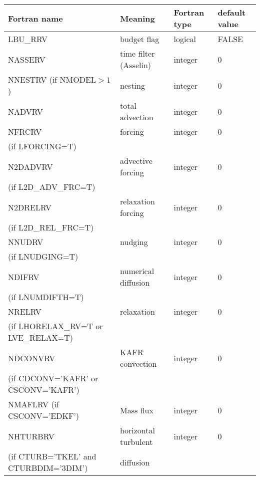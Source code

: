 \begin{center}
\begin{tabular} {|p{8cm}|p{4cm}|>{\centering}p{1.5cm}|p{1.5cm}<{\centering}|}
\hline
Fortran name & Meaning & Fortran type & default value \\
\hline\hline
LBU\_RRV & budget flag & logical & FALSE\index{LBU\_RRV!\innam{NAM\_BU\_RRV}} \\\hline
NASSERV  & time filter (Asselin)   & integer  &  0 \index{NASSERV!\innam{NAM\_BU\_RRV}} \\\hline
NNESTRV (if NMODEL$>1$) & nesting           & integer  &  0 \index{NNESTRV!\innam{NAM\_BU\_RRV}} \\\hline
NADVRV   & total advection   & integer  &  0 \index{NADVRV!\innam{NAM\_BU\_RTH}}\\\hline
NFRCRV   & forcing           & integer  &  0 \index{NFRCRV!\innam{NAM\_BU\_RRV}} \\
(if LFORCING=T) &  &   &   \\\hline
N2DADVRV   &advective forcing           & integer  &  0 \index{N2DADVRV!\innam{NAM\_BU\_RRV}} \\
(if L2D\_ADV\_FRC=T) &  &   &   \\\hline
N2DRELRV   & relaxation forcing           & integer  &  0 \index{N2DRLERV!\innam{NAM\_BU\_RRV}} \\
(if L2D\_REL\_FRC=T) &  &   &   \\\hline
NNUDRV   & nudging           & integer  &  0 \index{NNUDRV!\innam{NAM\_BU\_RRV}} \\
(if LNUDGING=T) &  &   &   \\\hline
NDIFRV   & numerical diffusion & integer  &  0 \index{NDIFRV!\innam{NAM\_BU\_RRV}}\\
(if LNUMDIFTH=T) &  &   &   \\\hline
NRELRV   & relaxation        & integer  &  0 \index{NRELRV!\innam{NAM\_BU\_RRV}}\\
(if LHORELAX\_RV=T or LVE\_RELAX=T) &  &   &   \\\hline
NDCONVRV  & KAFR convection   & integer  &  0 \index{NDCONVRV!\innam{NAM\_BU\_RRV}}\\
(if CDCONV='KAFR' or CSCONV='KAFR') &  &   &   \\\hline
NMAFLRV (if CSCONV='EDKF') & Mass flux & integer  &  0 \index{NMAFLRV!\innam{NAM\_BU\_RRV}} \\\hline
NHTURBRV & horizontal turbulent & integer  &  0 \index{NHTURBRV!\innam{NAM\_BU\_RRV}}\\
(if CTURB='TKEL' and CTURBDIM='3DIM') &diffusion &   &  \\\hline

\end{tabular}
\end{center}
